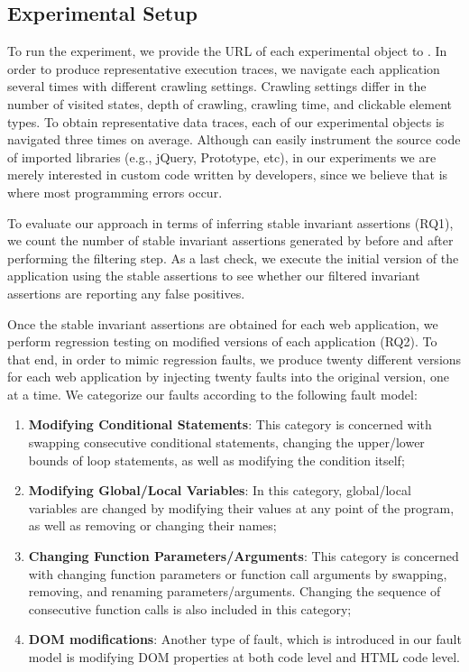 % 


\subsection{Experimental Setup}
To run the experiment, we provide the URL of each experimental object to \jsart. In order
to produce representative execution traces, we navigate each application several times with different crawling settings. Crawling settings differ in the number of visited states, depth of crawling, crawling time, and clickable element types.
To obtain representative data traces, each of our experimental objects is navigated three times on average. Although \jsart can easily instrument the source code of imported \javascript libraries (e.g., jQuery, Prototype, etc), in our experiments we are merely 
interested in custom code written by developers, since we believe that is where most programming errors occur.

To evaluate our approach in terms of inferring stable invariant assertions (RQ1), we count the number of stable invariant assertions generated by \jsart
before and after performing the filtering step. As a last check, we execute the initial version of the application using the stable assertions to see whether
our filtered invariant assertions are reporting any false positives.

Once the stable invariant assertions are obtained for each web application, we perform regression testing on modified versions of each application (RQ2). To that end, in order to mimic regression faults, we produce twenty different versions for each web application by injecting twenty faults into the original version, one at a time. We categorize our faults according to the following fault model:

\begin{enumerate}
\item {\bf Modifying Conditional Statements}: This category is concerned with swapping consecutive conditional statements, changing the upper/lower bounds of
loop statements, as well as modifying the condition itself;  
\item {\bf Modifying Global/Local Variables}: In this category, global/local variables are changed by modifying their values at any point of the program, 
as well as removing or changing their names; 
\item {\bf Changing Function Parameters/Arguments}: This category is concerned with changing function parameters or function call arguments by swapping, removing, and renaming
parameters/arguments. Changing the sequence of consecutive function calls is also included in this category;   
\item {\bf DOM modifications}: Another type of fault, which is introduced in our fault model is modifying DOM properties at both \javascript code level and HTML code level.
\end{enumerate}

